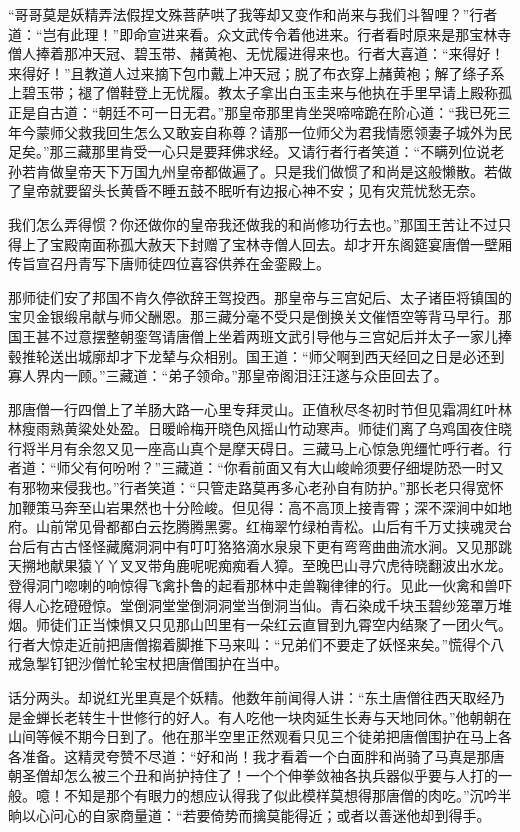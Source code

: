\documentclass[12pt,UTF8]{ctexbook}
\begin{document}
“哥哥莫是妖精弄法假捏文殊菩萨哄了我等却又变作和尚来与我们斗智哩？”行者道：“岂有此理！”即命宣进来看。众文武传令着他进来。行者看时原来是那宝林寺僧人捧着那冲天冠、碧玉带、赭黄袍、无忧履进得来也。行者大喜道：“来得好！来得好！”且教道人过来摘下包巾戴上冲天冠；脱了布衣穿上赭黄袍；解了绦子系上碧玉带；褪了僧鞋登上无忧履。教太子拿出白玉圭来与他执在手里早请上殿称孤正是自古道：“朝廷不可一日无君。”那皇帝那里肯坐哭啼啼跪在阶心道：“我已死三年今蒙师父救我回生怎么又敢妄自称尊？请那一位师父为君我情愿领妻子城外为民足矣。”那三藏那里肯受一心只是要拜佛求经。又请行者行者笑道：“不瞒列位说老孙若肯做皇帝天下万国九州皇帝都做遍了。只是我们做惯了和尚是这般懒散。若做了皇帝就要留头长黄昏不睡五鼓不眠听有边报心神不安；见有灾荒忧愁无奈。

我们怎么弄得惯？你还做你的皇帝我还做我的和尚修功行去也。”那国王苦让不过只得上了宝殿南面称孤大赦天下封赠了宝林寺僧人回去。却才开东阁筵宴唐僧一壁厢传旨宣召丹青写下唐师徒四位喜容供养在金銮殿上。

那师徒们安了邦国不肯久停欲辞王驾投西。那皇帝与三宫妃后、太子诸臣将镇国的宝贝金银缎帛献与师父酬恩。那三藏分毫不受只是倒换关文催悟空等背马早行。那国王甚不过意摆整朝銮驾请唐僧上坐着两班文武引导他与三宫妃后并太子一家儿捧毂推轮送出城廓却才下龙辇与众相别。国王道：“师父啊到西天经回之日是必还到寡人界内一顾。”三藏道：“弟子领命。”那皇帝阁泪汪汪遂与众臣回去了。

那唐僧一行四僧上了羊肠大路一心里专拜灵山。正值秋尽冬初时节但见霜凋红叶林林瘦雨熟黄粱处处盈。日暖岭梅开晓色风摇山竹动寒声。师徒们离了乌鸡国夜住晓行将半月有余忽又见一座高山真个是摩天碍日。三藏马上心惊急兜缰忙呼行者。行者道：“师父有何吩咐？”三藏道：“你看前面又有大山峻岭须要仔细堤防恐一时又有邪物来侵我也。”行者笑道：“只管走路莫再多心老孙自有防护。”那长老只得宽怀加鞭策马奔至山岩果然也十分险峻。但见得：高不高顶上接青霄；深不深涧中如地府。山前常见骨都都白云扢腾腾黑雾。红梅翠竹绿柏青松。山后有千万丈挟魂灵台台后有古古怪怪藏魔洞洞中有叮叮狢狢滴水泉泉下更有弯弯曲曲流水涧。又见那跳天搠地献果猿丫丫叉叉带角鹿呢呢痴痴看人獐。至晚巴山寻穴虎待晓翻波出水龙。登得洞门唿喇的响惊得飞禽扑鲁的起看那林中走兽鞠律律的行。见此一伙禽和兽吓得人心扢磴磴惊。堂倒洞堂堂倒洞洞堂当倒洞当仙。青石染成千块玉碧纱笼罩万堆烟。师徒们正当悚惧又只见那山凹里有一朵红云直冒到九霄空内结聚了一团火气。行者大惊走近前把唐僧搊着脚推下马来叫：“兄弟们不要走了妖怪来矣。”慌得个八戒急掣钉钯沙僧忙轮宝杖把唐僧围护在当中。

话分两头。却说红光里真是个妖精。他数年前闻得人讲：“东土唐僧往西天取经乃是金蝉长老转生十世修行的好人。有人吃他一块肉延生长寿与天地同休。”他朝朝在山间等候不期今日到了。他在那半空里正然观看只见三个徒弟把唐僧围护在马上各各准备。这精灵夸赞不尽道：“好和尚！我才看着一个白面胖和尚骑了马真是那唐朝圣僧却怎么被三个丑和尚护持住了！一个个伸拳敛袖各执兵器似乎要与人打的一般。噫！不知是那个有眼力的想应认得我了似此模样莫想得那唐僧的肉吃。”沉吟半晌以心问心的自家商量道：“若要倚势而擒莫能得近；或者以善迷他却到得手。
\end{document}
